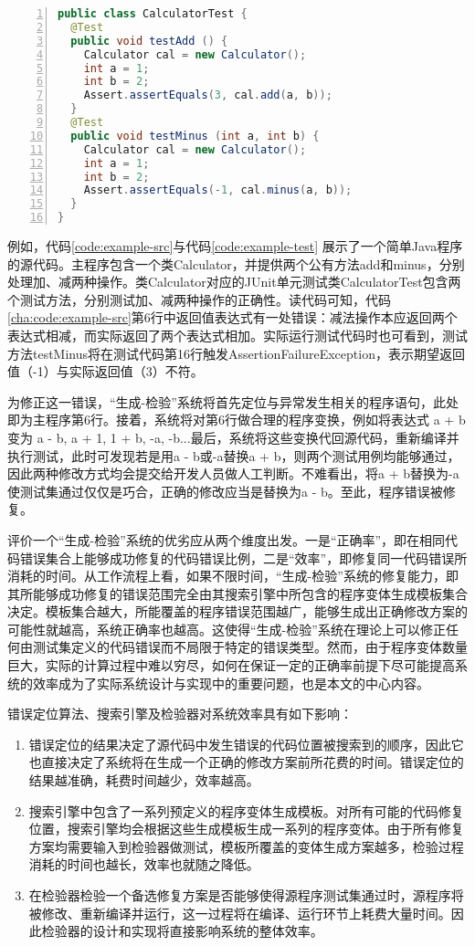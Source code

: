 \begin{lstlisting}[caption=“生成-检验”框架应用示例,frame=single,language=Java,numbers=left,basicstyle=\ttfamily\footnotesize,label=code:example-test]
public class CalculatorTest {  
  @Test
  public void testAdd () {
    Calculator cal = new Calculator();
    int a = 1;
    int b = 2;
    Assert.assertEquals(3, cal.add(a, b));
  }  
  @Test
  public void testMinus (int a, int b) {
    Calculator cal = new Calculator();
    int a = 1;
    int b = 2;
    Assert.assertEquals(-1, cal.minus(a, b));
  }  
}
\end{lstlisting}

例如，代码\ref{code:example-src}与代码\ref{code:example-test}
展示了一个简单Java程序的源代码。主程序包含一个类Calculator，并提供两个公有方法add和minus，分别处理加、减两种操作。类Calculator对应的JUnit单元测试类CalculatorTest包含两个测试方法，分别测试加、减两种操作的正确性。读代码可知，代码\ref{cha:code:example-src}第6行中返回值表达式有一处错误：减法操作本应返回两个表达式相减，而实际返回了两个表达式相加。实际运行测试代码时也可看到，测试方法testMinus将在测试代码第16行触发AssertionFailureException，表示期望返回值（-1）与实际返回值（3）不符。

为修正这一错误，“生成-检验”系统将首先定位与异常发生相关的程序语句，此处即为主程序第6行。接着，系统将对第6行做合理的程序变换，例如将表达式 a + b 变为 a - b, a + 1, 1 + b, -a, -b...最后，系统将这些变换代回源代码，重新编译并执行测试，此时可发现若是用a - b或-a替换a + b，则两个测试用例均能够通过，因此两种修改方式均会提交给开发人员做人工判断。不难看出，将a + b替换为-a使测试集通过仅仅是巧合，正确的修改应当是替换为a - b。至此，程序错误被修复。


评价一个“生成-检验”系统的优劣应从两个维度出发。一是“正确率”，即在相同代码错误集合上能够成功修复的代码错误比例，二是“效率”，即修复同一代码错误所消耗的时间。从工作流程上看，如果不限时间，“生成-检验”系统的修复能力，即其所能够成功修复的错误范围完全由其搜索引擎中所包含的程序变体生成模板集合决定。模板集合越大，所能覆盖的程序错误范围越广，能够生成出正确修改方案的可能性就越高，系统正确率也越高。这使得“生成-检验”系统在理论上可以修正任何由测试集定义的代码错误而不局限于特定的错误类型。然而，由于程序变体数量巨大，实际的计算过程中难以穷尽，如何在保证一定的正确率前提下尽可能提高系统的效率成为了实际系统设计与实现中的重要问题，也是本文的中心内容。

错误定位算法、搜索引擎及检验器对系统效率具有如下影响：
\begin{enumerate}
	\item 错误定位的结果决定了源代码中发生错误的代码位置被搜索到的顺序，因此它也直接决定了系统将在生成一个正确的修改方案前所花费的时间。错误定位的结果越准确，耗费时间越少，效率越高。
	\item 搜索引擎中包含了一系列预定义的程序变体生成模板。对所有可能的代码修复位置，搜索引擎均会根据这些生成模板生成一系列的程序变体。由于所有修复方案均需要输入到检验器做测试，模板所覆盖的变体生成方案越多，检验过程消耗的时间也越长，效率也就随之降低。
	\item 在检验器检验一个备选修复方案是否能够使得源程序测试集通过时，源程序将被修改、重新编译并运行，这一过程将在编译、运行环节上耗费大量时间。因此检验器的设计和实现将直接影响系统的整体效率。
\end{enumerate}

